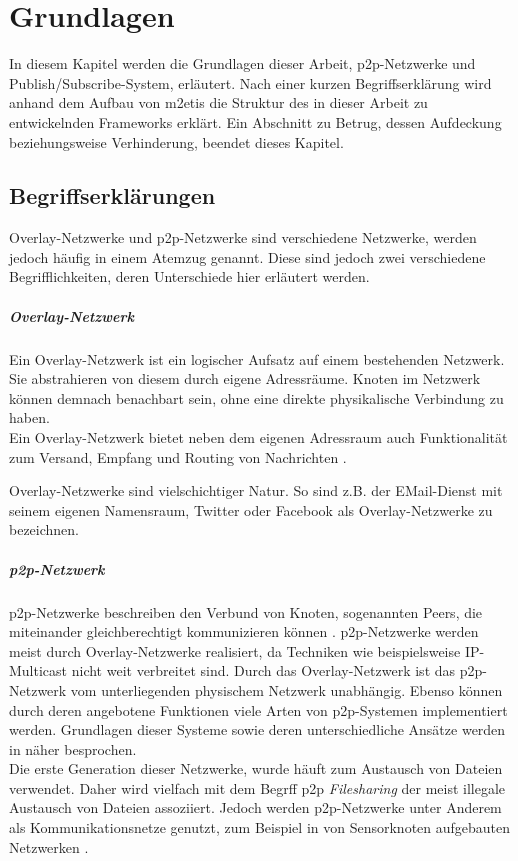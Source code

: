 \chapter{Grundlagen}
\label{chap:grundlagen}

In diesem Kapitel werden die Grundlagen dieser Arbeit, \ac{p2p}-Netzwerke und Publish/Subscribe-System, erläutert. Nach einer kurzen Begriffserklärung wird anhand dem Aufbau von \ac{m2etis} die Struktur des in dieser Arbeit zu entwickelnden Frameworks erklärt. Ein Abschnitt zu Betrug, dessen Aufdeckung beziehungsweise Verhinderung, beendet dieses Kapitel.

\section{Begriffserklärungen}

Overlay-Netzwerke und \ac{p2p}-Netzwerke sind verschiedene Netzwerke, werden jedoch häufig in einem Atemzug genannt. Diese sind jedoch zwei verschiedene Begrifflichkeiten, deren Unterschiede hier erläutert werden.

\paragraph{Overlay-Netzwerk} Ein Overlay-Netzwerk ist ein logischer Aufsatz auf einem bestehenden Netzwerk. Sie abstrahieren von diesem durch eigene Adressräume. Knoten im Netzwerk können demnach benachbart sein, ohne eine direkte physikalische Verbindung zu haben.\\
Ein Overlay-Netzwerk bietet neben dem eigenen Adressraum auch Funktionalität zum Versand, Empfang und Routing von Nachrichten \cite{Tannenbaum2003}.

Overlay-Netzwerke sind vielschichtiger Natur. So sind z.B. der EMail-Dienst mit seinem eigenen Namensraum, Twitter oder Facebook als Overlay-Netzwerke zu bezeichnen.

\paragraph{\ac{p2p}-Netzwerk} p2p-Netzwerke beschreiben den Verbund von Knoten, sogenannten Peers, die miteinander gleichberechtigt kommunizieren können \cite{Steinmetz2005}. p2p-Netzwerke werden meist durch Overlay-Netzwerke realisiert, da Techniken wie beispielsweise IP-Multicast \cite{Deering1990Multicast} nicht weit verbreitet sind. Durch das Overlay-Netzwerk ist das p2p-Netzwerk vom unterliegenden physischem Netzwerk unabhängig. Ebenso können durch deren angebotene Funktionen viele Arten von p2p-Systemen implementiert werden. Grundlagen dieser Systeme sowie deren unterschiedliche Ansätze werden in  näher besprochen.\\
Die erste Generation dieser Netzwerke, wurde häuft zum Austausch von Dateien verwendet. Daher wird vielfach mit dem Begrff \ac{p2p} \emph{Filesharing} der meist illegale Austausch von Dateien assoziiert. Jedoch werden p2p-Netzwerke unter Anderem als Kommunikationsnetze genutzt, zum Beispiel in von Sensorknoten aufgebauten Netzwerken \cite{MuneebAliandKoenLangendoen2007Case, Darlagiannis2006Peertopeer}.

